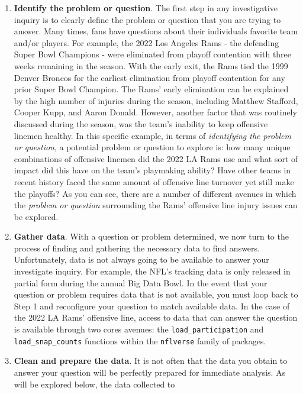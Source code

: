 \documentclass[
  letterpaper,
]{krantz}
\begin{document}
\begin{enumerate}
\def\labelenumi{\arabic{enumi}.}
\item
  \textbf{Identify the problem or question}. The first step in any
  investigative inquiry is to clearly define the problem or question
  that you are trying to answer. Many times, fans have questions about
  their individuals favorite team and/or players. For example, the 2022
  Los Angeles Rams - the defending Super Bowl Champions - were
  eliminated from playoff contention with three weeks remaining in the
  season. With the early exit, the Rams tied the 1999 Denver Broncos for
  the earliest elimination from playoff contention for any prior Super
  Bowl Champion. The Rams' early elimination can be explained by the
  high number of injuries during the season, including Matthew Stafford,
  Cooper Kupp, and Aaron Donald. However, another factor that was
  routinely discussed during the season, was the team's inability to
  keep offensive linemen healthy. In this specific example, in terms of
  \emph{identifying the problem or question}, a potential problem or
  question to explore is: how many unique combinations of offensive
  linemen did the 2022 LA Rams use and what sort of impact did this have
  on the team's playmaking ability? Have other teams in recent history
  faced the same amount of offensive line turnover yet still make the
  playoffs? As you can see, there are a number of different avenues in
  which the \emph{problem or question} surrounding the Rams' offensive
  line injury issues can be explored.
\item
  \textbf{Gather data}. With a question or problem determined, we now
  turn to the process of finding and gathering the necessary data to
  find answers. Unfortunately, data is not always going to be available
  to answer your investigate inquiry. For example, the NFL's tracking
  data is only released in partial form during the annual Big Data Bowl.
  In the event that your question or problem requires data that is not
  available, you must loop back to Step 1 and reconfigure your question
  to match available data. In the case of the 2022 LA Rams' offensive
  line, access to data that can answer the question is available through
  two cores avenues: the \texttt{load\_participation} and
  \texttt{load\_snap\_counts} functions within the \texttt{nflverse}
  family of packages.
\item
  \textbf{Clean and prepare the data}. It is not often that the data you
  obtain to answer your question will be perfectly prepared for
  immediate analysis. As will be explored below, the data collected to

\end{enumerate}
\end{document}
